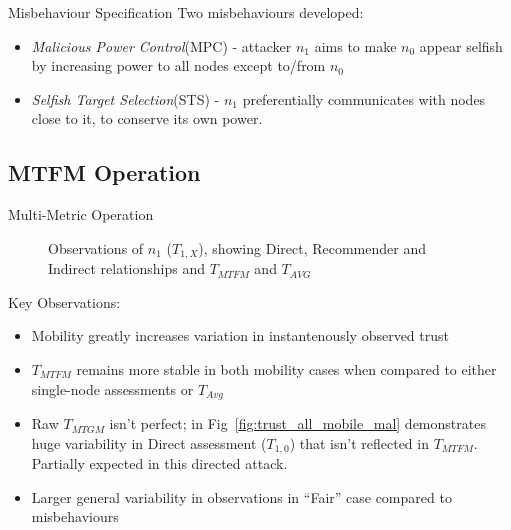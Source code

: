\documentclass{beamer}
\begin{document}
\begin{frame}{Misbehaviour Specification}
  Two misbehaviours developed:
  \begin{itemize}
    \item \emph{Malicious Power Control}(MPC) - attacker $n_1$ aims to make $n_0$ appear selfish by increasing power to all nodes except to/from $n_0$
    \item \emph{Selfish Target Selection}(STS) - $n_1$ preferentially communicates with nodes close to it, to conserve its own power.
  \end{itemize}

\end{frame}

\subsection{MTFM Operation}

\begin{frame}[allowframebreaks]{Multi-Metric Operation}
  \setcounter{subfigure}{0}%
  \begin{figure}[htp]
    \centering
    \hfil
    \hfil
    \hfil

    \hfil
    \hfil
    \hfil
    \caption{Observations of $n_1$ ($T_{1,X}$), showing Direct, Recommender and Indirect relationships and $T_{MTFM}$ and $T_{AVG}$\hyperlink{fig:trust_mobility_closeup}{}}
    \label{fig:trust_mobility}
  \end{figure}
\framebreak
Key Observations: 
  \begin{itemize}
    \item Mobility greatly increases variation in instantenously observed trust
    \item $T_{MTFM}$ remains more stable in both mobility cases when compared to either single-node assessments or $T_{Avg}$
    \item Raw $T_{MTGM}$ isn't perfect; in Fig~\ref{fig:trust_all_mobile_mal} demonstrates huge variability in Direct assessment ($T_{1,0}$) that isn't reflected in $T_{MTFM}$. Partially expected in this directed attack.
    \item Larger general variability in observations in ``Fair'' case compared to misbehaviours
  \end{itemize}
\end{frame}
\end{document}
